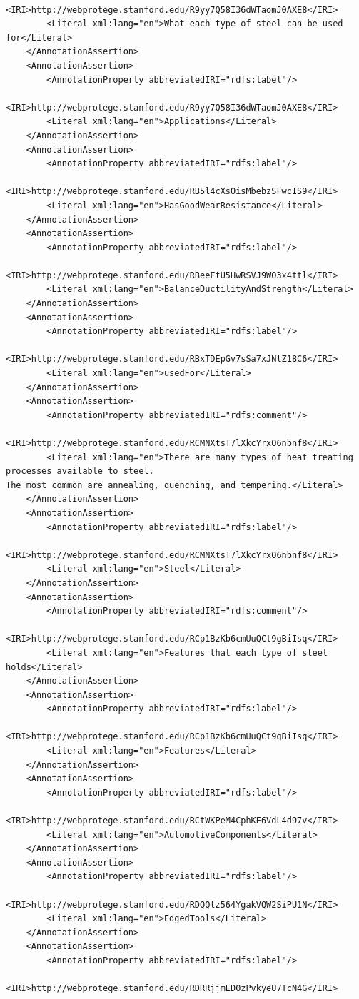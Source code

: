 \documentclass[12pt]{article}
\begin{document}
{\begin{lstlisting}
		<IRI>http://webprotege.stanford.edu/R9yy7Q58I36dWTaomJ0AXE8</IRI>
		<Literal xml:lang="en">What each type of steel can be used for</Literal>
	</AnnotationAssertion>
	<AnnotationAssertion>
		<AnnotationProperty abbreviatedIRI="rdfs:label"/>
		<IRI>http://webprotege.stanford.edu/R9yy7Q58I36dWTaomJ0AXE8</IRI>
		<Literal xml:lang="en">Applications</Literal>
	</AnnotationAssertion>
	<AnnotationAssertion>
		<AnnotationProperty abbreviatedIRI="rdfs:label"/>
		<IRI>http://webprotege.stanford.edu/RB5l4cXsOisMbebzSFwcIS9</IRI>
		<Literal xml:lang="en">HasGoodWearResistance</Literal>
	</AnnotationAssertion>
	<AnnotationAssertion>
		<AnnotationProperty abbreviatedIRI="rdfs:label"/>
		<IRI>http://webprotege.stanford.edu/RBeeFtU5HwRSVJ9WO3x4ttl</IRI>
		<Literal xml:lang="en">BalanceDuctilityAndStrength</Literal>
	</AnnotationAssertion>
	<AnnotationAssertion>
		<AnnotationProperty abbreviatedIRI="rdfs:label"/>
		<IRI>http://webprotege.stanford.edu/RBxTDEpGv7sSa7xJNtZ18C6</IRI>
		<Literal xml:lang="en">usedFor</Literal>
	</AnnotationAssertion>
	<AnnotationAssertion>
		<AnnotationProperty abbreviatedIRI="rdfs:comment"/>
		<IRI>http://webprotege.stanford.edu/RCMNXtsT7lXkcYrxO6nbnf8</IRI>
		<Literal xml:lang="en">There are many types of heat treating processes available to steel. 
The most common are annealing, quenching, and tempering.</Literal>
	</AnnotationAssertion>
	<AnnotationAssertion>
		<AnnotationProperty abbreviatedIRI="rdfs:label"/>
		<IRI>http://webprotege.stanford.edu/RCMNXtsT7lXkcYrxO6nbnf8</IRI>
		<Literal xml:lang="en">Steel</Literal>
	</AnnotationAssertion>
	<AnnotationAssertion>
		<AnnotationProperty abbreviatedIRI="rdfs:comment"/>
		<IRI>http://webprotege.stanford.edu/RCp1BzKb6cmUuQCt9gBiIsq</IRI>
		<Literal xml:lang="en">Features that each type of steel holds</Literal>
	</AnnotationAssertion>
	<AnnotationAssertion>
		<AnnotationProperty abbreviatedIRI="rdfs:label"/>
		<IRI>http://webprotege.stanford.edu/RCp1BzKb6cmUuQCt9gBiIsq</IRI>
		<Literal xml:lang="en">Features</Literal>
	</AnnotationAssertion>
	<AnnotationAssertion>
		<AnnotationProperty abbreviatedIRI="rdfs:label"/>
		<IRI>http://webprotege.stanford.edu/RCtWKPeM4CphKE6VdL4d97v</IRI>
		<Literal xml:lang="en">AutomotiveComponents</Literal>
	</AnnotationAssertion>
	<AnnotationAssertion>
		<AnnotationProperty abbreviatedIRI="rdfs:label"/>
		<IRI>http://webprotege.stanford.edu/RDQQlz564YgakVQW2SiPU1N</IRI>
		<Literal xml:lang="en">EdgedTools</Literal>
	</AnnotationAssertion>
	<AnnotationAssertion>
		<AnnotationProperty abbreviatedIRI="rdfs:label"/>
		<IRI>http://webprotege.stanford.edu/RDRRjjmED0zPvkyeU7TcN4G</IRI>

\end{lstlisting}}
\end{document}
